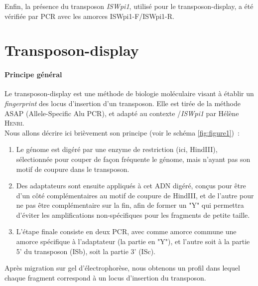 
Enfin, la présence du transposon \textit{ISWpi1}, utilisé pour le transposon-display, a été vérifiée par PCR avec les amorces ISWpi1-F/ISWpi1-R.

\section{Transposon-display} %
\label{sec:transposon_display}

	\paragraph{Principe général} %
	\label{par:principe_TnDisp}
	Le transposon-display est une méthode de biologie moléculaire visant à établir un \textit{fingerprint} des locus d'insertion d'un transposon. 
	Elle est tirée de la méthode ASAP (Allele-Specific Alu PCR)\cite{ASAP}, et adapté au contexte /\textit{ISWpi1} par Hélène \textsc{Henri}\cite{memHH}.\\
	Nous allons décrire ici brièvement son principe (voir le schéma \ref{fig:figure1})~:
	\begin{enumerate}
		\item Le génome est digéré par une enzyme de restriction (ici, HindIII), sélectionnée pour couper de façon fréquente le génome, mais n'ayant pas son motif de coupure dans le transposon.
		\item Des adaptateurs
		sont ensuite appliqués à cet ADN digéré, conçus pour être d'un côté complémentaires au motif de coupure de HindIII, et de l'autre pour ne pas être complémentaire sur la fin, afin de former un "Y" qui permettra d'éviter les amplifications non-spécifiques pour les fragments de petite taille.
		\item L'étape finale consiste en deux PCR, avec comme amorce commune une amorce spécifique à l'adaptateur (la partie en "Y"), et l'autre soit à la partie 5' du transposon (ISb), soit la partie 3' (ISc).
	\end{enumerate}
	Après migration sur gel d'électrophorèse, nous obtenons un profil dans lequel chaque fragment correspond à un locus d'insertion du transposon.

